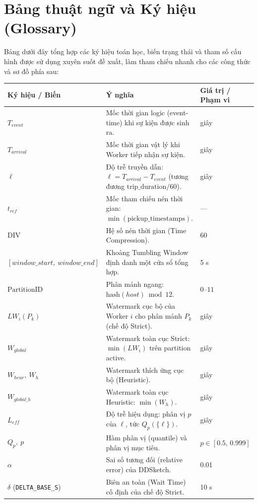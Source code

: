 \documentclass[12pt,a4paper]{article}
\begin{document}
\section{Bảng thuật ngữ và Ký hiệu (Glossary)}

Bảng dưới đây tổng hợp các ký hiệu toán học, biến trạng thái và tham số cấu hình được sử dụng xuyên suốt đề xuất, làm tham chiếu nhanh cho các công thức và sơ đồ phía sau:

\begin{longtable}{p{} p{} p{}}
\toprule
\textbf{Ký hiệu / Biến} & \textbf{Ý nghĩa} & \textbf{Giá trị / Phạm vi} \\
\midrule
\endhead
$T_{event}$ & Mốc thời gian logic (event-time) khi sự kiện được sinh ra. & giây \\
$T_{arrival}$ & Mốc thời gian vật lý khi Worker tiếp nhận sự kiện. & giây \\
$\ell$ & Độ trễ truyền dẫn: $\ell = T_{arrival} - T_{event}$ (tương đương $\text{trip\_duration}/60$). & giây \\
$t_{ref}$ & Mốc tham chiếu nén thời gian: $\min(\text{pickup\_timestamps})$. & --- \\
$\text{DIV}$ & Hệ số nén thời gian (Time Compression). & 60 \\
$[window\_start,\ window\_end]$ & Khoảng Tumbling Window định danh một cửa sổ tổng hợp. & 5 s \\
$\text{PartitionID}$ & Phân mảnh ngang: $\text{hash}(host) \bmod 12$. & $0$--$11$ \\
$LW_i(P_k)$ & Watermark cục bộ của Worker $i$ cho phân mảnh $P_k$ (chế độ Strict). & giây \\
$W_{global}$ & Watermark toàn cục Strict: $\min(LW_i)$ trên partition active. & giây \\
$W_{heur},\ W_h$ & Watermark thích ứng cục bộ (Heuristic). & giây \\
$W_{global\_h}$ & Watermark toàn cục Heuristic: $\min(W_h)$. & giây \\
$L_{eff}$ & Độ trễ hiệu dụng: phân vị $p$ của $\ell$, tức $Q_p(\{\ell\})$. & giây \\
$Q_p,\ p$ & Hàm phân vị (quantile) và phân vị mục tiêu. & $p \in [0.5,\, 0.999]$ \\
$\alpha$ & Sai số tương đối (relative error) của DDSketch. & 0.01 \\
$\delta$ (\texttt{DELTA\_BASE\_S}) & Biên an toàn (Wait Time) cố định của chế độ Strict. & 10 s \\

\end{longtable}
\end{document}
